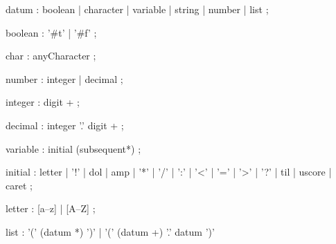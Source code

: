 \begin{rail}
  datum : boolean
  | character
  | variable
  | string
  | number
  | list
  ;

  boolean : '\#t' | '\#f' ;

  char : anyCharacter ;

  number : integer | decimal ;

  integer : digit + ;

  decimal : integer '.' digit + ;

  variable : initial (subsequent*) ;

  initial : letter | '!' | dol | amp | '*' | '/' | ':' | '<' | '=' | '>' | '?' | til | uscore | caret ;

  letter : [a--z] | [A--Z] ;


  list : '(' (datum *) ')' | '(' (datum +) '.' datum ')'

\end{rail}
